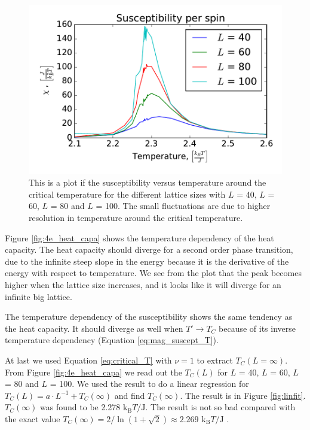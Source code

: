 \begin{figure}[H]
\includegraphics[width=\linewidth]{../results/4e/4e_x}\caption{This is a plot if the susceptibility versus temperature around the critical temperature for the different lattice sizes with $L$ = 40, $L$ = 60, $L$ = 80 and $L$ = 100. The small fluctuations are due to higher resolution in temperature around the critical temperature.}\label{fig:4e_suscept}
\end{figure}

Figure \ref{fig:4e_heat_capa} shows the temperature dependency of the heat capacity. The heat capacity should diverge for a second order phase transition, due to the infinite steep slope in the energy because it is the derivative of the energy with respect to temperature. We see from the plot that the peak becomes higher when the lattice size increases, and it looks like it will diverge for an infinite big lattice.

The temperature dependency of the susceptibility shows the same tendency as the heat capacity. It should diverge as well when $T' \rightarrow T_C$ because of its inverse temperature dependency (Equation \ref{eq:mag_suscept_T}).

At last we used Equation \ref{eq:critical_T} with $\nu = 1$ to extract $T_C (L = \infty)$. From Figure \ref{fig:4e_heat_capa} we read out the $T_C(L)$ for $L$ = 40, $L$ = 60, $L$ = 80 and $L$ = 100. We used the result to do a linear regression for $T_C(L) = a\cdot L^{-1} + T_C(\infty)$ and find $T_C(\infty)$. The result is in Figure \ref{fig:linfit}. $T_C(\infty)$ was found to be 2.278 $\text{k}_\text{B}T/\text{J}$. The result is not so bad compared with the exact value $T_C(\infty) = 2/ \ln(1+\sqrt{
2}) \approx 2.269$ $\text{k}_\text{B}T/\text{J}$ \cite{Onsager}.

